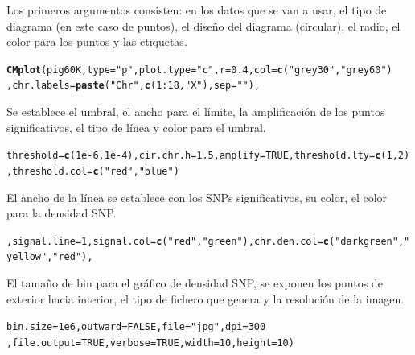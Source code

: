 \documentclass{article}\usepackage[]{graphicx}\usepackage[]{color}
\makeatletter
\newcommand{\hlstr}[1]{\textcolor[rgb]{0.192,0.494,0.8}{#1}}%
\newcommand{\hlkwd}[1]{\textcolor[rgb]{0.737,0.353,0.396}{\textbf{#1}}}%
\newenvironment{kframe}{%
 \def\at@end@of@kframe{}%
 \ifinner\ifhmode%
  \def\at@end@of@kframe{\end{minipage}}%
  \begin{minipage}{\columnwidth}%
 \fi\fi%
 \def\FrameCommand##1{\hskip\@totalleftmargin \hskip-\fboxsep
 \colorbox{shadecolor}{##1}\hskip-\fboxsep
     \hskip-\linewidth \hskip-\@totalleftmargin \hskip\columnwidth}%
 \MakeFramed {\advance\hsize-\width
   \@totalleftmargin\z@ \linewidth\hsize
   \@setminipage}}%
 {\par\unskip\endMakeFramed%
 \at@end@of@kframe}
\newenvironment{knitrout}{}{} %
\makeatother
\begin{document}
Los primeros argumentos consisten: en los datos que se van a usar, el tipo de diagrama (en este caso de puntos), el dise\~no del diagrama (circular), el radio, el color para los puntos y las etiquetas.
\begin{knitrout}
\color{fgcolor}\begin{kframe}
\begin{alltt}
\hlkwd{CMplot}(pig60K,type=\hlstr{"p"},plot.type=\hlstr{"c"},r=0.4,col=\hlkwd{c}(\hlstr{"grey30"},\hlstr{"grey60"})
       ,chr.labels=\hlkwd{paste}(\hlstr{"Chr"},\hlkwd{c}(1:18,\hlstr{"X"}),sep=\hlstr{""}),
\end{alltt}
\end{kframe}
\end{knitrout}
Se establece el umbral, el ancho para el l\'imite, la amplificaci\'on de los puntos significativos, el tipo de l\'inea y color para el umbral.
\begin{knitrout}
\color{fgcolor}\begin{kframe}
\begin{alltt}
      threshold=\hlkwd{c}(1e-6,1e-4),cir.chr.h=1.5,amplify=TRUE,threshold.lty=\hlkwd{c}(1,2)
      ,threshold.col=\hlkwd{c}(\hlstr{"red"},\hlstr{"blue"})
\end{alltt}
\end{kframe}
\end{knitrout}
El ancho de la l\'inea se establece con los SNPs significativos, su color, el color para la densidad SNP.
\begin{knitrout}
\color{fgcolor}\begin{kframe}
\begin{alltt}
      ,signal.line=1,signal.col=\hlkwd{c}(\hlstr{"red"},\hlstr{"green"}),chr.den.col=\hlkwd{c}(\hlstr{"darkgreen"},\hlstr{"yellow"},\hlstr{"red"}),
\end{alltt}
\end{kframe}
\end{knitrout}
El tama\~no de bin para el gr\'afico de densidad SNP, se exponen los puntos de exterior hacia interior, el tipo de fichero que genera y la resoluci\'on de la imagen.
\begin{knitrout}
\color{fgcolor}\begin{kframe}
\begin{alltt}
      bin.size=1e6,outward=FALSE,file=\hlstr{"jpg"},dpi=300
      ,file.output=TRUE,verbose=TRUE,width=10,height=10)
\end{alltt}
\end{kframe}
\end{knitrout}
\end{document}
